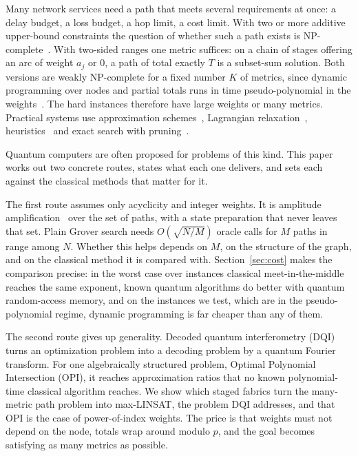 \documentclass[journal]{IEEEtran}
\begin{document}
Many network services need a path that meets several requirements at once: a delay budget, a loss budget, a hop limit, a cost limit. With two or more additive upper-bound constraints the question of whether such a path exists is NP-complete~\cite{wang1996,garey1979}. With two-sided ranges one metric suffices: on a chain of stages offering an arc of weight $a_{j}$ or $0$, a path of total exactly $T$ is a subset-sum solution. Both versions are weakly NP-complete for a fixed number $K$ of metrics, since dynamic programming over nodes and partial totals runs in time pseudo-polynomial in the weights~\cite{jaffe1984,hassin1992}. The hard instances therefore have large weights or many metrics. Practical systems use approximation schemes~\cite{hassin1992}, Lagrangian relaxation~\cite{juttner2001}, heuristics~\cite{korkmaz2001} and exact search with pruning~\cite{vanmieghem2004,kuipers2002,chemodanov2019}.

Quantum computers are often proposed for problems of this kind. This paper works out two concrete routes, states what each one delivers, and sets each against the classical methods that matter for it.

The first route assumes only acyclicity and integer weights. It is amplitude amplification~\cite{brassard2002} over the set of paths, with a state preparation that never leaves that set. Plain Grover search needs $O(\sqrt{N/M})$ oracle calls for $M$ paths in range among $N$. Whether this helps depends on $M$, on the structure of the graph, and on the classical method it is compared with. Section~\ref{sec:cost} makes the comparison precise: in the worst case over instances classical meet-in-the-middle reaches the same exponent, known quantum algorithms do better with quantum random-access memory, and on the instances we test, which are in the pseudo-polynomial regime, dynamic programming is far cheaper than any of them.

The second route gives up generality. Decoded quantum interferometry (DQI)~\cite{jordan2025} turns an optimization problem into a decoding problem by a quantum Fourier transform. For one algebraically structured problem, Optimal Polynomial Intersection (OPI), it reaches approximation ratios that no known polynomial-time classical algorithm reaches. We show which staged fabrics turn the many-metric path problem into max-LINSAT, the problem DQI addresses, and that OPI is the case of power-of-index weights. The price is that weights must not depend on the node, totals wrap around modulo $p$, and the goal becomes satisfying as many metrics as possible.
\end{document}
